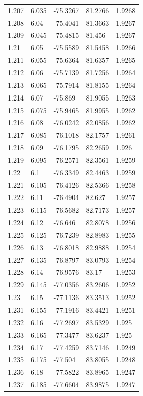 \begin{tabular}{lllll}
1.207 & 6.035 & -75.3267 & 81.2766 & 1.9268 \\
1.208 & 6.04 & -75.4041 & 81.3663 & 1.9267 \\
1.209 & 6.045 & -75.4815 & 81.456 & 1.9267 \\
1.21 & 6.05 & -75.5589 & 81.5458 & 1.9266 \\
1.211 & 6.055 & -75.6364 & 81.6357 & 1.9265 \\
1.212 & 6.06 & -75.7139 & 81.7256 & 1.9264 \\
1.213 & 6.065 & -75.7914 & 81.8155 & 1.9264 \\
1.214 & 6.07 & -75.869 & 81.9055 & 1.9263 \\
1.215 & 6.075 & -75.9465 & 81.9955 & 1.9262 \\
1.216 & 6.08 & -76.0242 & 82.0856 & 1.9262 \\
1.217 & 6.085 & -76.1018 & 82.1757 & 1.9261 \\
1.218 & 6.09 & -76.1795 & 82.2659 & 1.926 \\
1.219 & 6.095 & -76.2571 & 82.3561 & 1.9259 \\
1.22 & 6.1 & -76.3349 & 82.4463 & 1.9259 \\
1.221 & 6.105 & -76.4126 & 82.5366 & 1.9258 \\
1.222 & 6.11 & -76.4904 & 82.627 & 1.9257 \\
1.223 & 6.115 & -76.5682 & 82.7173 & 1.9257 \\
1.224 & 6.12 & -76.646 & 82.8078 & 1.9256 \\
1.225 & 6.125 & -76.7239 & 82.8983 & 1.9255 \\
1.226 & 6.13 & -76.8018 & 82.9888 & 1.9254 \\
1.227 & 6.135 & -76.8797 & 83.0793 & 1.9254 \\
1.228 & 6.14 & -76.9576 & 83.17 & 1.9253 \\
1.229 & 6.145 & -77.0356 & 83.2606 & 1.9252 \\
1.23 & 6.15 & -77.1136 & 83.3513 & 1.9252 \\
1.231 & 6.155 & -77.1916 & 83.4421 & 1.9251 \\
1.232 & 6.16 & -77.2697 & 83.5329 & 1.925 \\
1.233 & 6.165 & -77.3477 & 83.6237 & 1.925 \\
1.234 & 6.17 & -77.4259 & 83.7146 & 1.9249 \\
1.235 & 6.175 & -77.504 & 83.8055 & 1.9248 \\
1.236 & 6.18 & -77.5822 & 83.8965 & 1.9247 \\
1.237 & 6.185 & -77.6604 & 83.9875 & 1.9247 \\

\end{tabular}
